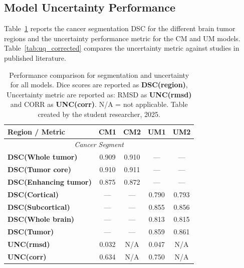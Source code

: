\documentclass[11pt,letterpaper]{article}
\begin{document}
\subsection{Model Uncertainty Performance}
Table~\ref{tab:combined_results_reordered} reports the cancer segmentation DSC for the different brain tumor regions and the uncertainty performance metric for the CM and UM models. Table~\ref{tab:uq_corrected} compares the uncertainty metric against studies in published literature.
\begin{table}[htbp]
\centering
\caption{Performance comparison for segmentation and uncertainty for all models. Dice scores are reported as \textbf{DSC(region)}, Uncertainty metric are reported as: RMSD as \textbf{UNC(rmsd)} and CORR as \textbf{UNC(corr)}. N/A = not applicable. Table created by the student researcher, 2025.}
\label{tab:combined_results_reordered}
\begin{tabular}{lcc|cc}
\toprule
\textbf{Region / Metric} & \textbf{CM1} & \textbf{CM2} & \textbf{UM1} & \textbf{UM2} \\
\midrule
\multicolumn{5}{c}{\textit{Cancer Segment}} \\
\midrule
\textbf{DSC(Whole tumor)} & 0.909 & 0.910 & — & — \\
\textbf{DSC(Tumor core)} & 0.910 & 0.911 & — & — \\
\textbf{DSC(Enhancing tumor)} & 0.875 & 0.872 & — & — \\
\midrule
\textbf{DSC(Cortical)} & — & — & 0.790 & 0.793 \\
\textbf{DSC(Subcortical)} & — & — & 0.855 & 0.856 \\
\textbf{DSC(Whole brain)} & — & — & 0.813 & 0.815 \\
\textbf{DSC(Tumor)} & — & — & 0.859 & 0.861 \\
\midrule
\textbf{UNC(rmsd)} & 0.032 & N/A & 0.047 & N/A \\
\textbf{UNC(corr)} & 0.634 & N/A & 0.750 & N/A \\
\bottomrule
\end{tabular}
\end{table}
\end{document}
